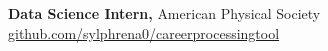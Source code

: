 \documentclass[11pt]{article}       %
\begin{document}
\textbf{Data Science Intern,} {American Physical Society} \hfill \href{https://github.com/sylphrena0/careerprocessingtool}{github.com/sylphrena0/careerprocessingtool} \\

\vspace{9pt}
\end{document}
